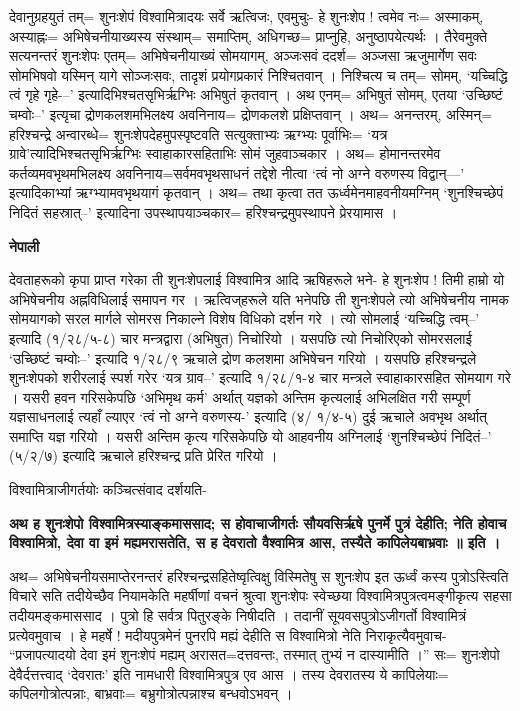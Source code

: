 \documentclass[11pt, a5paper]{article}
\begin{document}
देवानुग्रहयुतं तम्= शुनःशेपं विश्वामित्रादयः सर्वे ऋत्विजः, एवमुचुः- हे शुनःशेप ! त्वमेव नः= अस्माकम्, अस्याह्नः= अभिषेचनीयाख्यस्य संस्थाम्= समाप्तिम्, अधिगच्छ= प्राप्नुहि, अनुष्ठापयेत्यर्थः । तैरेवमुक्ते सत्यनन्तरं शुनःशेपः एतम्= अभिषेचनीयाख्यं सोमयागम्, अञ्जःसवं ददर्श= अञ्जसा ऋजुमार्गेण सवः सोमभिषवो यस्मिन् यागे सोञ्जःसवः, तादृशं प्रयोगप्रकारं निश्चितवान् । निश्चित्य च तम्= सोमम्, ‘यच्चिद्धि त्वं गृहे गृहे-–’ इत्यादिभिश्चतसृभिर्ऋग्भिः अभिषुतं कृतवान् । अथ एनम्= अभिषुतं सोमम्, एतया ‘उच्छिष्टं चम्वोः–’ इत्यृचा द्रोणकलशमभिलक्ष्य अवनिनाय= द्रोणकलशे प्रक्षिप्तवान् । अथ= अनन्तरम्, अस्मिन्= हरिश्चन्द्रे अन्वारब्धे= शुनःशेपदेहमुपस्पृष्टवति सत्युक्ताभ्यः ऋग्भ्यः पूर्वाभिः= ‘यत्र ग्रावे’त्यादिभिश्चतसृभिर्ऋग्भिः स्वाहाकारसहिताभिः सोमं जुहवाञ्चकार । अथ= होमानन्तरमेव कर्तव्यमवभृथमभिलक्ष्य अवनिनाय=सर्वमवभृथसाधनं तद्देशे नीत्वा ‘त्वं नो अग्ने वरुणस्य विद्वान्—’ इत्यादिकाभ्यां ऋग्भ्यामवभृथयागं कृतवान् । अथ=  तथा कृत्वा तत ऊर्ध्वमेनमाहवनीयमग्निम् ‘शुनश्चिच्छेपं निदितं सहस्रात्--’ इत्यादिना उपस्थापयाञ्चकार= हरिश्चन्द्रमुपस्थापने प्रेरयामास ।

\textbf{नेपाली}

देवताहरूको कृपा प्राप्त गरेका ती शुनःशेपलाई विश्वामित्र आदि ऋषिहरूले भने- हे शुनःशेप ! तिमी हाम्रो यो अभिषेचनीय अह्नविधिलाई समापन गर । ऋत्विज्‌हरूले यति भनेपछि ती शुनःशेपले त्यो अभिषेचनीय नामक सोमयागको सरल मार्गले सोमरस निकाल्ने विशेष विधिको दर्शन गरे । त्यो सोमलाई ‘यच्चिद्धि त्वम्–’ इत्यादि (१/२८/५-८) चार मन्त्रद्वारा (अभिषुत) निचोरियो । यसपछि त्यो निचोरिएको सोमरसलाई ‘उच्छिष्टं चम्वोः--’ इत्यादि १/२८/९ ऋचाले द्रोण कलशमा अभिषेचन गरियो । यसपछि हरिश्चन्द्रले शुनःशेपको शरीरलाई स्पर्श गरेर ‘यत्र ग्राव--’ इत्यादि १/२८/१-४ चार मन्त्रले स्वाहाकारसहित सोमयाग गरे । यसरी हवन गरिसकेपछि ‘अभिमृथ कर्म’ अर्थात् यज्ञको अन्तिम कृत्यलाई अभिलक्षित गरी सम्पूर्ण यज्ञसाधनलाई त्यहाँ ल्याएर ‘त्वं नो अग्ने वरुणस्य-’ इत्यादि (४/ १/४-५) दुई ऋचाले अवभृथ अर्थात् समाप्ति यज्ञ गरियो । यसरी अन्तिम कृत्य गरिसकेपछि यो आहवनीय अग्निलाई ‘शुनश्चिच्छेपं निदितं--’ (५/२/७) इत्यादि ऋचाले हरिश्चन्द्र प्रति प्रेरित गरियो ।

विश्वामित्राजीगर्तयोः कञ्चित्संवाद दर्शयति-

\textbf{अथ ह शुनःशेपो विश्वामित्रस्याङ्‍कमाससाद; स होवाचाजीगर्तः सौयवसिर्ऋषे पुनर्मे पुत्रं देहीति; नेति होवाच विश्वामित्रो, देवा वा इमं मह्यमरासतेति, स ह देवरातो वैश्वामित्र आस, तस्यैते कापिलेयबाभ्रवाः ॥ इति ।}

अथ= अभिषेचनीयसमाप्तेरनन्तरं हरिश्चन्द्रसहितेष्वृत्विक्षु विस्मितेषु स शुनःशेप इत ऊर्ध्वं कस्य पुत्रोऽस्त्विति विचारे सति तदीयेच्छैव नियामकेति महर्षीणां वचनं श्रुत्वा शुनःशेपः स्वेच्छया विश्वामित्रपुत्रत्वमङ्‌गीकृत्य सहसा तदीयमङ्कमाससाद । पुत्रो हि सर्वत्र पितुरङ्के निषीदति । तदानीं सूयवसपुत्रोऽजीगर्तो विश्वामित्रं प्रत्येवमुवाच । हे महर्षे ! मदीयपुत्रमेनं पुनरपि मह्यं देहीति स विश्वामित्रो नेति निराकृत्यैवमुवाच- “प्रजापत्यादयो देवा इमं शुनःशेपं मह्यम् अरासत=दत्तवन्तः, तस्मात् तुभ्यं न दास्यामीति ।” सः= शुनःशेपो देवैर्दत्तत्त्वाद् ‘देवरातः’ इति नामधारी विश्वामित्रपुत्र एव आस । तस्य देवरातस्य ये कापिलेयाः= कपिलगोत्रोत्‍पन्नाः, बाभ्रवाः= बभ्रुगोत्रोत्पन्नाश्च बन्धवोऽभवन् ।
\end{document}
